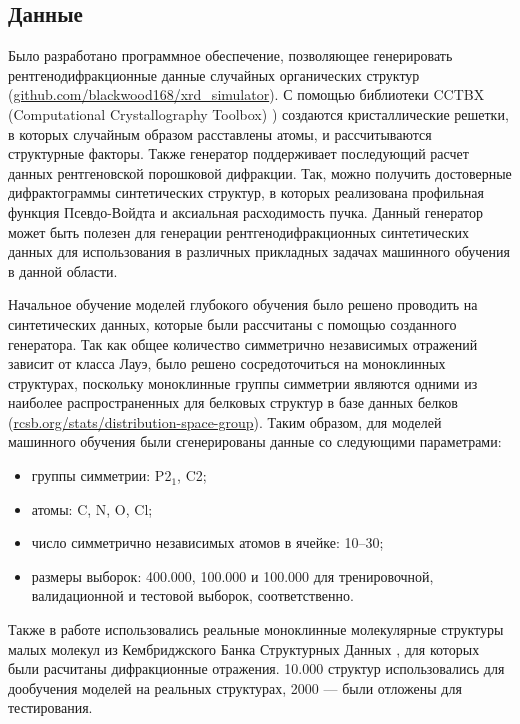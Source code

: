 \subsection{Данные}

Было разработано программное обеспечение, позволяющее генерировать рентгенодифракционные данные случайных органических структур (\url{github.com/blackwood168/xrd_simulator}). С помощью библиотеки CCTBX (Computational Crystallography Toolbox) \cite{grosse-kunstleve_computational_2002}) создаются кристаллические решетки, в которых случайным образом расставлены атомы, и рассчитываются структурные факторы. Также генератор поддерживает последующий расчет данных рентгеновской порошковой дифракции. Так, можно получить достоверные дифрактограммы синтетических структур, в которых реализована профильная функция Псевдо-Войдта \cite{david_powder_1986} и аксиальная расходимость пучка. Данный генератор может быть полезен для генерации рентгенодифракционных синтетических данных для использования в различных прикладных задачах машинного обучения в данной области.

Начальное обучение моделей глубокого обучения было решено проводить на синтетических данных, которые были рассчитаны с помощью созданного генератора. Так как общее количество симметрично независимых отражений зависит от класса Лауэ, было решено сосредоточиться на моноклинных структурах, поскольку моноклинные группы симметрии являются одними из наиболее распространенных для белковых структур в базе данных белков (\url{rcsb.org/stats/distribution-space-group}). Таким образом, для моделей машинного обучения были сгенерированы данные со следующими параметрами: 

\begin{itemize}
\item группы симметрии: P2$_1$, C2;
\item атомы: C, N, O, Cl;
\item число симметрично независимых атомов в ячейке: 10--30;
\item размеры выборок: 400.000, 100.000 и 100.000 для тренировочной, валидационной и тестовой выборок, соответственно.
\end{itemize}

Также в работе использовались реальные моноклинные молекулярные структуры малых молекул из Кембриджского Банка Структурных Данных \cite{csd}, для которых были расчитаны дифракционные отражения. 10.000 структур использовались для дообучения моделей на реальных структурах, 2000 --- были отложены для тестирования.



